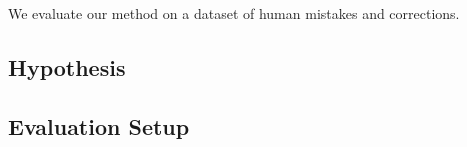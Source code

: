 \documentclass[sigplan,screen]{acmart}
\begin{document}

We evaluate our method on a dataset of human mistakes and corrections.

\subsection{Hypothesis}


\subsection{Evaluation Setup}




\end{document}
